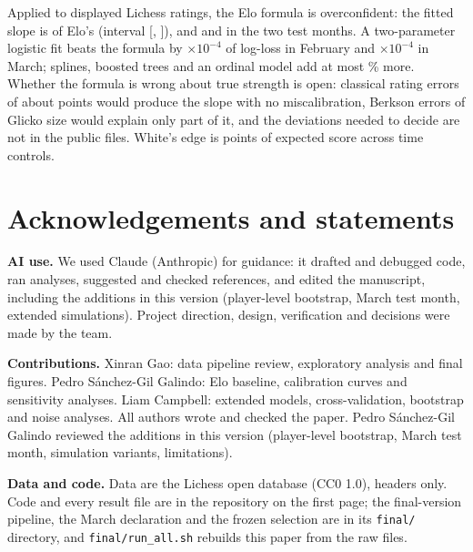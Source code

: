 \documentclass{article}
\newcommand{\tenm}{$\times 10^{-4}$}
\begin{document}
Applied to displayed Lichess ratings, the Elo formula is overconfident: the fitted slope is \SlopeAllJan{} of Elo's (interval [\SlopeAllJanLo{}, \SlopeAllJanHi{}]), and \SlopeAllFeb{} and \SlopeAllMar{} in the two test months. A two-parameter logistic fit beats the formula by \dEloBaseFebAbs{}\tenm{} of log-loss in February and \dEloBaseMarAbs{}\tenm{} in March; splines, boosted trees and an ordinal model add at most \gainPctBoost\% more. Whether the formula is wrong about true strength is open: classical rating errors of about \sigmaClass{} points would produce the slope with no miscalibration, Berkson errors of Glicko size would explain only part of it, and the deviations needed to decide are not in the public files. White's edge is \EdgePPAllJan{} points of expected score across time controls.

\section*{Acknowledgements and statements}

\textbf{AI use.} We used Claude (Anthropic) for guidance: it drafted and debugged code, ran analyses, suggested and checked references, and edited the manuscript, including the additions in this version (player-level bootstrap, March test month, extended simulations). Project direction, design, verification and decisions were made by the team.

\textbf{Contributions.} Xinran Gao: data pipeline review, exploratory analysis and final figures. Pedro S{\'a}nchez-Gil Galindo: Elo baseline, calibration curves and sensitivity analyses. Liam Campbell: extended models, cross-validation, bootstrap and noise analyses. All authors wrote and checked the paper. Pedro S{\'a}nchez-Gil Galindo reviewed the additions in this version (player-level bootstrap, March test month, simulation variants, limitations).

\textbf{Data and code.} Data are the Lichess open database (CC0 1.0), headers only. Code and every result file are in the repository on the first page; the final-version pipeline, the March declaration and the frozen selection are in its \texttt{final/} directory, and \texttt{final/run\_all.sh} rebuilds this paper from the raw files.
\end{document}
